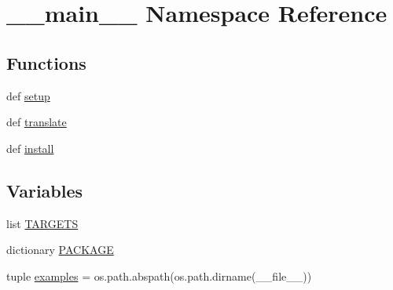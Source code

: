 \hypertarget{namespace____main____}{\section{\-\_\-\-\_\-main\-\_\-\-\_\- Namespace Reference}
\label{namespace____main____}
}
\subsection*{Functions}
\begin{DoxyCompactItemize}
\item 
def \hyperlink{namespace____main_____a8e2cfcfef6c6b573d5588ff90dcf0b22}{setup}
\item 
def \hyperlink{namespace____main_____a417c5a47dde10a8caf178c78460fb52a}{translate}
\item 
def \hyperlink{namespace____main_____ad3976b15c28da907857134421de3a3b7}{install}
\end{DoxyCompactItemize}
\subsection*{Variables}
\begin{DoxyCompactItemize}
\item 
list \hyperlink{namespace____main_____a8e28c558f02e44c4b181d5da3e284226}{T\-A\-R\-G\-E\-T\-S}
\item 
dictionary \hyperlink{namespace____main_____a8b036a60a3e9d527d6a490f0cbe750e6}{P\-A\-C\-K\-A\-G\-E}
\item 
tuple \hyperlink{namespace____main_____a7f39fde1632edc2f2ae4590e560d604c}{examples} = os.\-path.\-abspath(os.\-path.\-dirname(\-\_\-\-\_\-file\-\_\-\-\_\-))
\end{DoxyCompactItemize}


